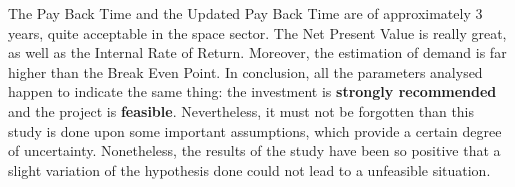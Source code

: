 The Pay Back Time and the Updated Pay Back Time are of approximately 3 years, quite acceptable in the space sector. The Net Present Value is really great, as well as the Internal Rate of Return. Moreover, the estimation of demand is far higher than the Break Even Point. In conclusion, all the parameters analysed happen to indicate the same thing: the investment is \textbf{strongly recommended} and the project is \textbf{feasible}. Nevertheless, it must not be forgotten than this study is done upon some important assumptions, which provide a certain degree of uncertainty. Nonetheless, the results of the study have been so positive that a slight variation of the hypothesis done could not lead to a unfeasible situation. 
